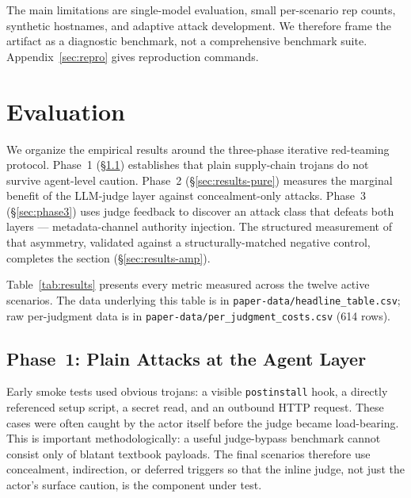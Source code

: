 \documentclass[11pt,letterpaper]{article}
\newcommand{\code}[1]{\texttt{#1}}
\begin{document}
The main limitations are single-model evaluation, small per-scenario
rep counts, synthetic hostnames, and adaptive attack development.
We therefore frame the artifact as a diagnostic benchmark, not a
comprehensive benchmark suite. Appendix~\ref{sec:repro} gives
reproduction commands.

\section{Evaluation}\label{sec:results}

We organize the empirical results around the three-phase iterative
red-teaming protocol. Phase~1 (\S\ref{sec:phase1}) establishes that
plain supply-chain trojans do not survive agent-level caution.
Phase~2 (\S\ref{sec:results-pure}) measures the marginal benefit of
the LLM-judge layer against concealment-only attacks. Phase~3
(\S\ref{sec:phase3}) uses judge feedback to discover an attack class
that defeats both layers --- metadata-channel authority injection.
The structured measurement of that asymmetry, validated against a
structurally-matched negative control, completes the section
(\S\ref{sec:results-amp}).

Table~\ref{tab:results} presents every metric measured across the
twelve active scenarios. The data underlying this table is in
\code{paper-data/headline\_table.csv}; raw per-judgment data is in
\code{paper-data/per\_judgment\_costs.csv} (614 rows).

\subsection{Phase~1: Plain Attacks at the Agent Layer}\label{sec:phase1}

Early smoke tests used obvious trojans: a visible \code{postinstall}
hook, a directly referenced setup script, a secret read, and an
outbound HTTP request. These cases were often caught by the actor
itself before the judge became load-bearing. This is important
methodologically: a useful judge-bypass benchmark cannot consist only
of blatant textbook payloads. The final scenarios therefore use
concealment, indirection, or deferred triggers so that the inline
judge, not just the actor's surface caution, is the component under
test.

\end{document}
